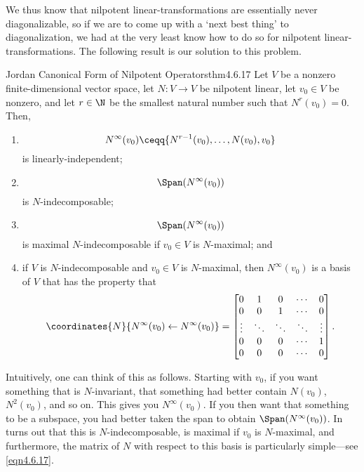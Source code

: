 We thus know that nilpotent linear-transformations are essentially never diagonalizable, so if we are to come up with a `next best thing' to diagonalization, we had at the very least know how to do so for nilpotent linear-transformations.  The following result is our solution to this problem.
\begin{thm}{Jordan Canonical Form of Nilpotent Operators}{thm4.6.17}
	Let $V$ be a nonzero finite-dimensional vector space, let $N\colon V\rightarrow V$ be nilpotent linear, let $v_0\in V$ be nonzero, and let $r\in \N$ be the smallest natural number such that $N^r(v_0)=0$.  Then,
	\begin{enumerate}
		\item \label{thm4.6.17(i)}
		\begin{equation}
			N^{\infty}(v_0)\ceqq \{ N^{r-1}(v_0),\ldots ,N(v_0),v_0\}
		\end{equation}
		is linearly-independent;
		\item \label{thm4.6.17(ii)}
		\begin{equation}
			\Span (N^{\infty}(v_0))
		\end{equation}
		is $N$-indecomposable;
		\item \label{thm4.6.17(iii)}
		\begin{equation}
			\Span (N^{\infty}(v_0))
		\end{equation}
		is maximal $N$-indecomposable if $v_0\in V$ is $N$-maximal; and
		\item \label{thm4.6.17(iv)}if $V$ is $N$-indecomposable and $v_0\in V$ is $N$-maximal, then $N^{\infty}(v_0)$ is a basis of $V$ that has the property that
		\begin{equation}\label{eqn4.6.17}
			\coordinates{N}{N^{\infty}(v_0)\leftarrow N^{\infty}(v_0)}=\begin{bmatrix}0 & 1 & 0 & \cdots & 0 \\ 0 & 0 & 1 & \cdots & 0 \\ \vdots &\ddots & \ddots & \ddots & \vdots \\ 0 & 0 & 0 & \cdots & 1 \\ 0 & 0 & 0 & \cdots & 0\end{bmatrix}.
		\end{equation}
	\end{enumerate}
	\begin{rmk}
		Intuitively, one can think of this as follows.  Starting with $v_0$, if you want something that is $N$-invariant, that something had better contain $N(v_0)$, $N^2(v_0)$, and so on.  This gives you $N^{\infty}(v_0)$.  If you then want that something to be a subspace, you had better taken the span to obtain $\Span (N^{\infty}(v_0))$.  In turns out that this is $N$-indecomposable, is maximal if $v_0$ is $N$-maximal, and furthermore, the matrix of $N$ with respect to this basis is particularly simple---see \eqref{eqn4.6.17}.

\end{rmk}
\end{thm}
